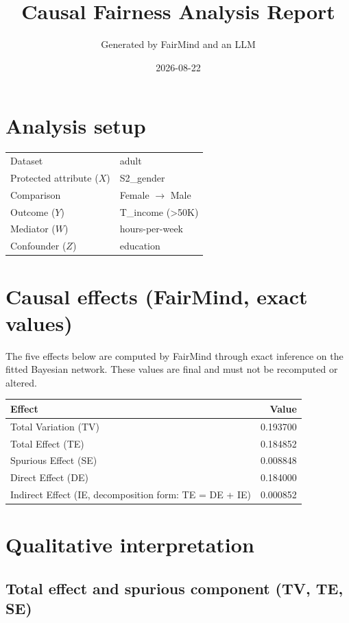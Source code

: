 \documentclass[11pt]{article}
\title{Causal Fairness Analysis Report}
\author{Generated by FairMind and an LLM}
\date{2026-08-22}
\begin{document}
\maketitle

\section{Analysis setup}

\begin{tabular}{ll}
\toprule
Dataset & adult \\
Protected attribute ($X$) & S2\_gender \\
Comparison & Female $\to$ Male \\
Outcome ($Y$) & T\_income (>50K) \\
Mediator ($W$) & hours-per-week \\
Confounder ($Z$) & education \\
\bottomrule
\end{tabular}

\section{Causal effects (FairMind, exact values)}

The five effects below are computed by FairMind through exact inference on the
fitted Bayesian network. These values are final and must not be recomputed or
altered.

\begin{tabular}{lr}
\toprule
Effect & Value \\
\midrule
Total Variation (TV) & 0.193700 \\
Total Effect (TE) & 0.184852 \\
Spurious Effect (SE) & 0.008848 \\
Direct Effect (DE) & 0.184000 \\
Indirect Effect (IE, decomposition form: TE = DE + IE) & 0.000852 \\
\bottomrule
\end{tabular}

\section{Qualitative interpretation}

\subsection{Total effect and spurious component (TV, TE, SE)}
\end{document}
